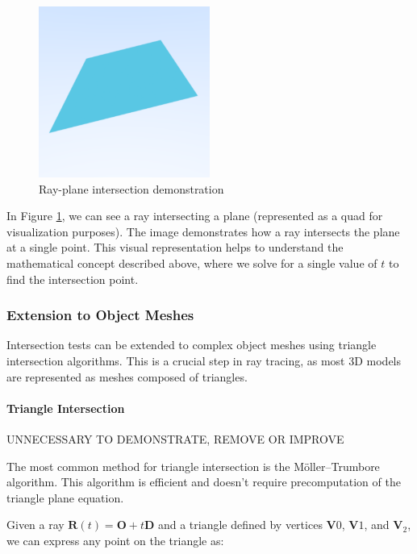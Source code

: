 \documentclass[12pt]{article}
\begin{document}
\begin{figure}[H]
    \centering
    \includegraphics[width=0.5\textwidth]{images/intersections/ray_quad_intersection.png}
    \caption{Ray-plane intersection demonstration}
    \label{fig:rayplaneintersection}
\end{figure}

In Figure \ref{fig:rayplaneintersection}, we can see a ray intersecting a plane (represented as a quad for visualization purposes). The image demonstrates how a ray intersects the plane at a single point. This visual representation helps to understand the mathematical concept described above, where we solve for a single value of \(t\) to find the intersection point.

\subsubsection{Extension to Object Meshes}

Intersection tests can be extended to complex object meshes using triangle intersection algorithms. This is a crucial step in ray tracing, as most 3D models are represented as meshes composed of triangles.

\paragraph{Triangle Intersection}

UNNECESSARY TO DEMONSTRATE, REMOVE OR IMPROVE


The most common method for triangle intersection is the Möller–Trumbore algorithm. This algorithm is efficient and doesn't require precomputation of the triangle plane equation.

Given a ray \(\mathbf{R}(t) = \mathbf{O} + t\mathbf{D}\) and a triangle defined by vertices \(\mathbf{V}0\), \(\mathbf{V}1\), and \(\mathbf{V}_2\), we can express any point on the triangle as:
\end{document}
